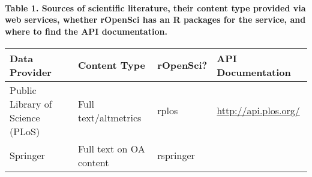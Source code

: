 \documentclass[author-year, review, 11pt]{components/elsarticle} %
\begin{document}
\paragraph{Table 1. Sources of scientific literature, their content type
provided via web services, whether rOpenSci has an R packages for the
service, and where to find the API
documentation.}\label{table-1.-sources-of-scientific-literature-their-content-type-provided-via-web-services-whether-ropensci-has-an-r-packages-for-the-service-and-where-to-find-the-api-documentation.}

\begin{longtable}[]{@{}llll@{}}
\toprule
\begin{minipage}[b]{0.36\columnwidth}\raggedright\strut
Data Provider\strut
\end{minipage} & \begin{minipage}[b]{0.23\columnwidth}\raggedright\strut
Content Type\strut
\end{minipage} & \begin{minipage}[b]{0.10\columnwidth}\raggedright\strut
rOpenSci?\strut
\end{minipage} & \begin{minipage}[b]{0.19\columnwidth}\raggedright\strut
API Documentation\strut
\end{minipage}\tabularnewline
\midrule
\endhead
\begin{minipage}[t]{0.36\columnwidth}\raggedright\strut
Public Library of Science (PLoS)\strut
\end{minipage} & \begin{minipage}[t]{0.23\columnwidth}\raggedright\strut
Full text/altmetrics\strut
\end{minipage} & \begin{minipage}[t]{0.10\columnwidth}\raggedright\strut
rplos\strut
\end{minipage} & \begin{minipage}[t]{0.19\columnwidth}\raggedright\strut
\url{http://api.plos.org/}\strut
\end{minipage}\tabularnewline
\begin{minipage}[t]{0.36\columnwidth}\raggedright\strut
Springer\strut
\end{minipage} & \begin{minipage}[t]{0.23\columnwidth}\raggedright\strut
Full text on OA content\strut
\end{minipage} & \begin{minipage}[t]{0.10\columnwidth}\raggedright\strut
rspringer\strut
\end{minipage} & \begin{minipage}[t]{0.19\columnwidth}\raggedright\strut

\end{minipage}
\end{longtable}
\end{document}

